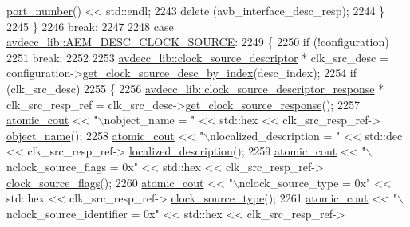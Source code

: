 \begin{DoxyCode}
      \hyperlink{classavdecc__lib_1_1avb__interface__descriptor__response_a1a239ddd0768d4a439a05a6ecc861e8c}{port\_number}() << std::endl;
2243             \textcolor{keyword}{delete} (avb\_interface\_desc\_resp);
2244         \}
2245     \}
2246     \textcolor{keywordflow}{break};
2247 
2248     \textcolor{keywordflow}{case} \hyperlink{namespaceavdecc__lib_ac7b7d227e46bc72b63ee9e9aae15902faad2bbd7b33d8d136ac379369c1d77091}{avdecc\_lib::AEM\_DESC\_CLOCK\_SOURCE}:
2249     \{
2250         \textcolor{keywordflow}{if} (!configuration)
2251             \textcolor{keywordflow}{break};
2252 
2253         \hyperlink{classavdecc__lib_1_1clock__source__descriptor}{avdecc\_lib::clock\_source\_descriptor} * clk\_src\_desc = 
      configuration->\hyperlink{classavdecc__lib_1_1configuration__descriptor_aefc07c368de7626396dbf6d6605f1b48}{get\_clock\_source\_desc\_by\_index}(desc\_index);
2254         \textcolor{keywordflow}{if} (clk\_src\_desc)
2255         \{
2256             \hyperlink{classavdecc__lib_1_1clock__source__descriptor__response}{avdecc\_lib::clock\_source\_descriptor\_response} * 
      clk\_src\_resp\_ref = clk\_src\_desc->\hyperlink{classavdecc__lib_1_1clock__source__descriptor_abeab06c506fbd0127358623bfd189787}{get\_clock\_source\_response}();
2257             \hyperlink{cmd__line_8h_a0bc38ccc65c79ba06c6fcd7b4bf554c3}{atomic\_cout} << \textcolor{stringliteral}{"\(\backslash\)nobject\_name = "} << std::hex << clk\_src\_resp\_ref->
      \hyperlink{classavdecc__lib_1_1descriptor__response__base_a133f7774946d80f82b8aaaa4cfbb7361}{object\_name}();
2258             \hyperlink{cmd__line_8h_a0bc38ccc65c79ba06c6fcd7b4bf554c3}{atomic\_cout} << \textcolor{stringliteral}{"\(\backslash\)nlocalized\_description = "} << std::dec << clk\_src\_resp\_ref->
      \hyperlink{classavdecc__lib_1_1clock__source__descriptor__response_a1fb9de45567df344090a1407aa6b775f}{localized\_description}();
2259             \hyperlink{cmd__line_8h_a0bc38ccc65c79ba06c6fcd7b4bf554c3}{atomic\_cout} << \textcolor{stringliteral}{"\(\backslash\)nclock\_source\_flags = 0x"} << std::hex << clk\_src\_resp\_ref->
      \hyperlink{classavdecc__lib_1_1clock__source__descriptor__response_a56c79adbce8dc216dcf75ef9d07f9d8d}{clock\_source\_flags}();
2260             \hyperlink{cmd__line_8h_a0bc38ccc65c79ba06c6fcd7b4bf554c3}{atomic\_cout} << \textcolor{stringliteral}{"\(\backslash\)nclock\_source\_type = 0x"} << std::hex << clk\_src\_resp\_ref->
      \hyperlink{classavdecc__lib_1_1clock__source__descriptor__response_a284b9325d868e1cdc4aca47aa760bc67}{clock\_source\_type}();
2261             \hyperlink{cmd__line_8h_a0bc38ccc65c79ba06c6fcd7b4bf554c3}{atomic\_cout} << \textcolor{stringliteral}{"\(\backslash\)nclock\_source\_identifier = 0x"} << std::hex << clk\_src\_resp\_ref->

\end{DoxyCode}

